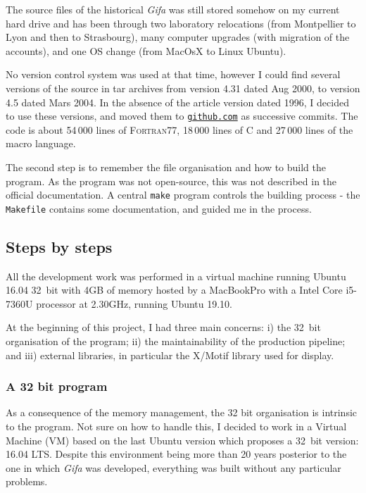 The source files of the historical \emph{Gifa} was still stored somehow
on my current hard drive and has been through two laboratory relocations
(from Montpellier to Lyon and then to Strasbourg), many computer
upgrades (with migration of the accounts), and one OS change (from
MacOsX to Linux Ubuntu).

No version control system was used at that time, however I could find
several versions of the source in tar archives from version 4.31
dated Aug 2000, to version 4.5 dated Mars 2004. In the absence of the
article version dated 1996, I decided to use these versions, and moved
them to \href{https://github.com/delsuc/Gifa}{\texttt{github.com}} as
successive commits. The code is about 54\,000 lines of F\textsc{ortran}77,
18\,000 lines of C and 27\,000 lines of the macro language.

The second step is to remember the file organisation and how to build
the program. As the program was not open-source, this was not described
in the official documentation. A central \texttt{make} program controls
the building process - the \texttt{Makefile} contains some
documentation, and guided me in the process.

\hypertarget{steps-by-steps}{%
\subsection{Steps by steps}\label{steps-by-steps}}

All the development work was performed in a virtual machine running
Ubuntu 16.04 32~bit with 4GB of memory hosted by a MacBookPro with a Intel Core
i5-7360U processor at 2.30GHz, running Ubuntu 19.10.

At the beginning of this project, I had three main concerns: i) the 32~bit organisation of the program; ii) the maintainability of the
production pipeline; and iii) external libraries, in particular the
X/Motif library used for display.

\hypertarget{A-32--program}{%
\subsubsection{A 32 bit program}\label{A-32-bit-program}}

As a consequence of the memory management, the 32 bit organisation is
intrinsic to the program. Not sure on how to handle this, I decided to
work in a Virtual Machine (VM) based on the last Ubuntu version which
proposes a 32\ bit version: 16.04 LTS. Despite this environment being more
than 20 years posterior to the one in which \emph{Gifa} was developed,
everything was built without any particular problems.

